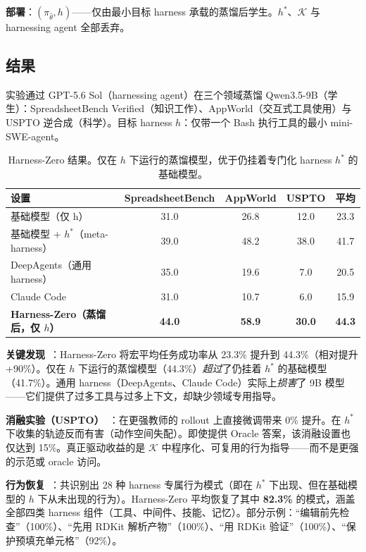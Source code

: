 \textbf{部署}：$(\pi_{\hat{\theta}}, h)$——仅由最小目标 harness 承载的蒸馏后学生。$h^*$、$\mathcal{K}$ 与 harnessing agent 全部丢弃。

\subsection{结果}
\label{subsec:harness-zero-results}

实验通过 GPT-5.6 Sol（harnessing agent）在三个领域蒸馏 Qwen3.5-9B（学生）：SpreadsheetBench Verified（知识工作）、AppWorld（交互式工具使用）与 USPTO 逆合成（科学）。目标 harness $h$：仅带一个 Bash 执行工具的最小 mini-SWE-agent。

\begin{table}[ht!]
\centering
\caption{Harness-Zero 结果。仅在 $h$ 下运行的蒸馏模型，优于仍挂着专门化 harness $h^*$ 的基础模型。}
{\small
\begin{tabular}{@{}lcccc@{}}
\toprule
\textbf{设置} & \textbf{SpreadsheetBench} & \textbf{AppWorld} & \textbf{USPTO} & \textbf{平均} \\
\midrule
基础模型（仅 h） & 31.0 & 26.8 & 12.0 & 23.3 \\
基础模型 + $h^*$（meta-harness） & 39.0 & 48.2 & 38.0 & 41.7 \\
DeepAgents（通用 harness） & 35.0 & 19.6 & 7.0 & 20.5 \\
Claude Code & 31.0 & 10.7 & 6.0 & 15.9 \\
\textbf{Harness-Zero（蒸馏后，仅 $h$）} & \textbf{44.0} & \textbf{58.9} & \textbf{30.0} & \textbf{44.3} \\
\bottomrule
\end{tabular}
}
\end{table}

\textbf{关键发现}~\cite{ye2026harnesszero}：Harness-Zero 将宏平均任务成功率从 23.3\% 提升到 44.3\%（相对提升 +90\%）。仅在 $h$ 下运行的蒸馏模型（44.3\%）\emph{超过}了仍挂着 $h^*$ 的基础模型（41.7\%）。通用 harness（DeepAgents、Claude Code）实际上\emph{损害}了 9B 模型——它们提供了过多工具与过多上下文，却缺少领域专用指导。

\textbf{消融实验（USPTO）}~\cite{ye2026harnesszero}：在更强教师的 rollout 上直接微调带来 0\% 提升。在 $h^*$ 下收集的轨迹反而有害（动作空间失配）。即使提供 Oracle 答案，该消融设置也仅达到 15\%。真正驱动收益的是 $\mathcal{K}$ 中程序化、可复用的行为指导——而不是更强的示范或 oracle 访问。

\textbf{行为恢复}~\cite{ye2026harnesszero}：共识别出 28 种 harness 专属行为模式（即在 $h^*$ 下出现、但在基础模型的 $h$ 下从未出现的行为）。Harness-Zero 平均恢复了其中 \textbf{82.3\%} 的模式，涵盖全部四类 harness 组件（工具、中间件、技能、记忆）。部分示例：“编辑前先检查”（100\%）、“先用 RDKit 解析产物”（100\%）、“用 RDKit 验证”（100\%）、“保护预填充单元格”（92\%）。

